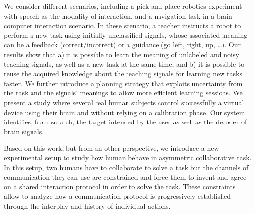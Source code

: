 \begin{vcenterpage}
We consider different scenarios, including a pick and place robotics experiment with speech as the modality of interaction, and a navigation task in a brain computer interaction scenario. In these scenario, a teacher instructs a robot to perform a new task using initially unclassified signals, whose associated meaning can be a feedback (correct/incorrect) or a guidance (go left, right, up, \ldots). Our results show that a) it is possible to learn the meaning of unlabeled and noisy teaching signals, as well as a new task at the same time, and b) it is possible to reuse the acquired knowledge about the teaching signals for learning new tasks faster. We further introduce a planning strategy that exploits uncertainty from the task and the signals' meanings to allow more efficient learning sessions. We present a study where several real human subjects control successfully a virtual device using their brain and without relying on a calibration phase. Our system identifies, from scratch, the target intended by the user as well as the decoder of brain signals.



Based on this work, but from an other perspective, we introduce a new experimental setup to study how human behave in asymmetric collaborative task. In this setup, two humans have to collaborate to solve a task but the channels of communication they can use are constrained and force them to invent and agree on a shared interaction protocol in order to solve the task. These constraints allow to analyze how a communication protocol is progressively established through the interplay and history of individual actions.







\end{vcenterpage}